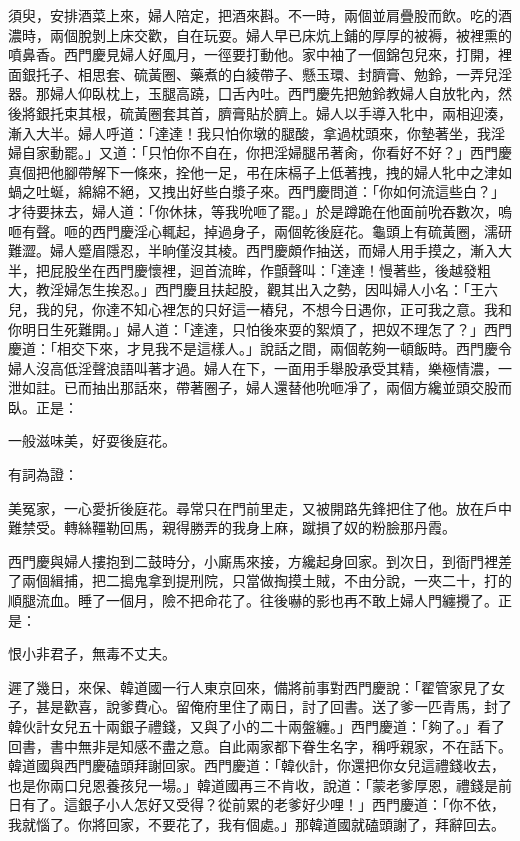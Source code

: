 須臾，安排酒菜上來，婦人陪定，把酒來斟。不一時，兩個並肩疊股而飲。吃的酒濃時，兩個脫剝上床交歡，自在玩耍。婦人早已床炕上鋪的厚厚的被褥，被裡熏的噴鼻香。西門慶見婦人好風月，一徑要打動他。家中袖了一個錦包兒來，打開，裡面銀托子、相思套、硫黃圈、藥煮的白綾帶子、懸玉環、封臍膏、勉鈴，一弄兒淫器。那婦人仰臥枕上，玉腿高蹺，囗舌內吐。西門慶先把勉鈴教婦人自放牝內，然後將銀托束其根，硫黃圈套其首，臍膏貼於臍上。婦人以手導入牝中，兩相迎湊，漸入大半。婦人呼道：「達達！我只怕你墩的腿酸，拿過枕頭來，你墊著坐，我淫婦自家動罷。」又道：「只怕你不自在，你把淫婦腿吊著肏，你看好不好？」西門慶真個把他腳帶解下一條來，拴他一足，弔在床槅子上低著拽，拽的婦人牝中之津如蝸之吐蜒，綿綿不絕，又拽出好些白漿子來。西門慶問道：「你如何流這些白？」才待要抹去，婦人道：「你休抹，等我吮咂了罷。」於是蹲跪在他面前吮吞數次，嗚咂有聲。咂的西門慶淫心輒起，掉過身子，兩個乾後庭花。龜頭上有硫黃圈，濡研難澀。婦人蹙眉隱忍，半晌僅沒其棱。西門慶頗作抽送，而婦人用手摸之，漸入大半，把屁股坐在西門慶懷裡，迴首流眸，作顫聲叫：「達達！慢著些，後越發粗大，教淫婦怎生挨忍。」西門慶且扶起股，觀其出入之勢，因叫婦人小名：「王六兒，我的兒，你達不知心裡怎的只好這一樁兒，不想今日遇你，正可我之意。我和你明日生死難開。」婦人道：「達達，只怕後來耍的絮煩了，把奴不理怎了？」西門慶道：「相交下來，才見我不是這樣人。」說話之間，兩個乾夠一頓飯時。西門慶令婦人沒高低淫聲浪語叫著才過。婦人在下，一面用手舉股承受其精，樂極情濃，一泄如註。已而抽出那話來，帶著圈子，婦人還替他吮咂凈了，兩個方纔並頭交股而臥。正是：

一般滋味美，好耍後庭花。

有詞為證：

美冤家，一心愛折後庭花。尋常只在門前里走，又被開路先鋒把住了他。放在戶中難禁受。轉絲韁勒回馬，親得勝弄的我身上麻，蹴損了奴的粉臉那丹霞。

西門慶與婦人摟抱到二鼓時分，小廝馬來接，方纔起身回家。到次日，到衙門裡差了兩個緝捕，把二搗鬼拿到提刑院，只當做掏摸土賊，不由分說，一夾二十，打的順腿流血。睡了一個月，險不把命花了。往後嚇的影也再不敢上婦人門纏攪了。正是：

恨小非君子，無毒不丈夫。

遲了幾日，來保、韓道國一行人東京回來，備將前事對西門慶說：「翟管家見了女子，甚是歡喜，說爹費心。留俺府里住了兩日，討了回書。送了爹一匹青馬，封了韓伙計女兒五十兩銀子禮錢，又與了小的二十兩盤纏。」西門慶道：「夠了。」看了回書，書中無非是知感不盡之意。自此兩家都下眷生名字，稱呼親家，不在話下。韓道國與西門慶磕頭拜謝回家。西門慶道：「韓伙計，你還把你女兒這禮錢收去，也是你兩口兒恩養孩兒一場。」韓道國再三不肯收，說道：「蒙老爹厚恩，禮錢是前日有了。這銀子小人怎好又受得？從前累的老爹好少哩！」西門慶道：「你不依，我就惱了。你將回家，不要花了，我有個處。」那韓道國就磕頭謝了，拜辭回去。

